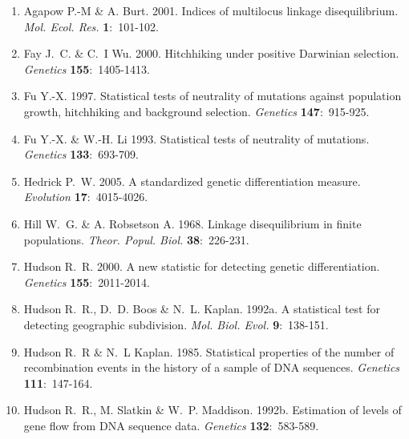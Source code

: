 \documentclass{scrartcl}
\begin{document}
\begin{flushleft}
\begin{enumerate}[leftmargin=!,labelindent=5pt,itemindent=-15pt]

    \item[] Agapow P.-M \& A. Burt. 2001. Indices of multilocus linkage
        disequilibrium. \textit{Mol. Ecol. Res.} \textbf{1}:~101-102.

    \item[] Fay J.~C. \& C.~I Wu. 2000. Hitchhiking under positive
        Darwinian selection. \textit{Genetics} \textbf{155}:~1405-1413.

    \item[] Fu Y.-X. 1997. Statistical tests of neutrality of mutations
        against population growth, hitchhiking and background selection.
        \textit{Genetics} \textbf{147}:~915-925.

    \item[] Fu Y.-X. \& W.-H. Li 1993. Statistical tests of neutrality
        of mutations. \textit{Genetics} \textbf{133}:~693-709.

    \item[] Hedrick P.~W. 2005. A standardized genetic differentiation
        measure. \textit{Evolution} \textbf{17}:~4015-4026.

    \item[] Hill W.~G. \& A. Robsetson A. 1968. Linkage disequilibrium
        in finite populations. \textit{Theor. Popul. Biol.}
        \textbf{38}:~226-231.

    \item[] Hudson R.~R. 2000. A new statistic for detecting genetic
        differentiation. \textit{Genetics} \textbf{155}:~2011-2014.

    \item[] Hudson R.~R., D.~D. Boos \& N.~L. Kaplan. 1992a. A
        statistical test for detecting geographic subdivision.
        \textit{Mol. Biol. Evol.} \textbf{9}:~138-151.

    \item[] Hudson R.~R \& N.~L Kaplan. 1985. Statistical properties of
        the number of recombination events in the history of a sample of
        DNA sequences. \textit{Genetics} \textbf{111}:~147-164.

    \item[] Hudson R.~R., M. Slatkin \& W.~P. Maddison. 1992b.
        Estimation of levels of gene flow from DNA sequence data.
        \textit{Genetics} \textbf{132}:~583-589.


\end{enumerate}
\end{flushleft}
\end{document}
